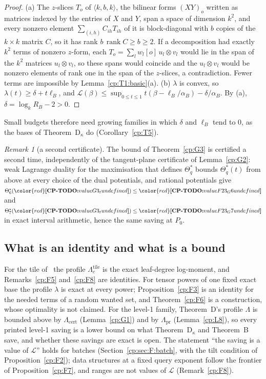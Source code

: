 \documentclass[11pt]{article}
\makeatletter
\theoremstyle{definition}
\theoremstyle{remark}
\newtheorem{remark}[theorem]{Remark}
\DeclareRobustCommand{\CPTODO}[1]{{\color{red}\textbf{[CP-TODO:} #1\textbf{]}}}
\DeclareMathOperator{\rk}{rank}
\newcommand{\mat}[3]{\langle #1,#2,#3\rangle} %
\newcommand{\alB}{\alpha_B}                   %
\newcommand{\RB}{R_B}                         %
\newcommand{\Lam}{\Lambda}                    %
\newcommand{\Lampr}{\Lambda_{\mathrm{pr}}}    %
\newcommand{\Lamcert}{\Lambda_{\mathrm{cert}}}%
\newcommand{\ThmD}{Theorem~D}                               %
\newcommand{\ThmDk}{Theorem~D\texorpdfstring{\ensuremath{_\kappa}}{\_kappa}}     %
\newcommand{\ThmB}{Theorem~B}                               %
\newcommand{\Pzero}{P_0}                      %
\newcommand{\Leg}{\mathcal{L}}                        %
\newcommand{\LamT}[1]{\Lambda^{\mathrm{tile}}_{#1}}   %
\newcommand{\cpv}[1]{\ifcsname cpv@#1\endcsname\csname cpv@#1\endcsname\else\CPTODO{value #1 undefined}\fi}
\makeatother
\begin{document}
\begin{proof}
(a) The $z$-slices $T_o$ of $\mat kbk$, the bilinear forms $(XY)_o$ written as matrices indexed by the entries of $X$ and $Y$, span a space of dimension $k^2$, and every nonzero element $\sum_{(i,h)}C_{ih}T_{ih}$ of it is block-diagonal with $b$ copies of the $k\times k$ matrix $C$, so it has rank $b\,\rk C\ge b\ge2$. If a decomposition had exactly $k^2$ terms of nonzero $z$-form, each $T_o=\sum_lw_l[o]\,u_l\otimes v_l$ would lie in the span of the $k^2$ matrices $u_l\otimes v_l$, so these spans would coincide and the $u_l\otimes v_l$ would be nonzero elements of rank one in the span of the $z$-slices, a contradiction. Fewer terms are impossible by Lemma~\ref{cp:T1:basic}(a).
(b) $\lambda$ is convex, so $\lambda(t)\ge\delta+t\ell_B$, and $\Leg(\beta)\le\sup_{0\le t\le1}t(\beta-\ell_B/\alB)-\delta/\alB$. By (a), $\delta=\log_k\RB-2>0$.
\end{proof}

Small budgets therefore need growing families in which $\delta$ and $\ell_B$ tend to $0$, as the bases of \ThmDk{} do (Corollary~\ref{cp:T5}).

\begin{remark}[a second certificate]\label{cp:F23}
The bound of Theorem~\ref{cp:G3} is certified a second time, independently of the tangent-plane certificate of Lemma~\ref{cp:G2}: weak Lagrange duality for the maximisation that defines $\Theta^*_q$ bounds $\Theta^*_q(t)$ from above at every choice of the dual potentials, and rational potentials give $\Theta^*_6(\cpv{G3_t})\le\cpv{F23_G6}$ and $\Theta^*_7(\cpv{G3_t})\le\cpv{F23_G7}$ in exact interval arithmetic, hence the same saving at $\Pzero$.
\end{remark}

\subsection{What is an identity and what is a bound}\label{cp:sec:F:wording}

For the tile of~\cite{v2} the profile $\LamT c$ is the exact leaf-degree log-moment, and Remarks~\ref{cp:F5} and~\ref{cp:F8} are identities. For tensor powers of one fixed exact base the profile $\lambda$ is exact at every power; Proposition~\ref{cp:F3} is an identity for the needed terms of a random wanted set, and Theorem~\ref{cp:F6} is a construction, whose optimality is not claimed. For the level-1 family, \ThmD's profile $\Lam$ is bounded above by $\Lamcert$ (Lemma~\ref{cp:G1}) and by $\Lampr$ (Lemma~\ref{cp:L8}), so every printed level-1 saving is a lower bound on what \ThmDk{} and \ThmB{} save, and whether these savings are exact is open. The statement ``the saving is a value of $\Leg$'' holds for batches (Section~\ref{cp:sec:F:batch}, with the tilt condition of Proposition~\ref{cp:F2}); data structures at a fixed query exponent follow the frontier of Proposition~\ref{cp:F7}, and ranges are not values of $\Leg$ (Remark~\ref{cp:F8}).
\end{document}
